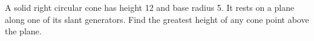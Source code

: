 A solid right circular cone has height 12 and base radius 5. It rests on a plane along one of its slant generators. Find the greatest height of any cone point above the plane.
